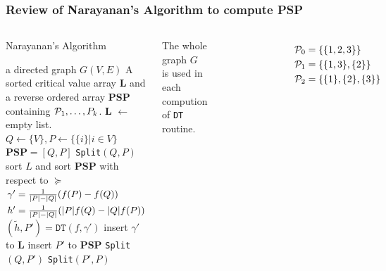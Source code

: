 \documentclass[notheorems]{beamer}
\begin{document}
\begin{frame}
\frametitle{Review of Narayanan's Algorithm to compute PSP}
\begin{columns}
\begin{algorithm}[H]
\caption*{Narayanan's Algorithm}\label{alg:psp}
{\tiny
\begin{algorithmic}[1]
\REQUIRE a directed graph $G(V,E)$
\ENSURE A sorted critical value array \textbf{L} and a reverse ordered array \textbf{PSP} containing $\P_1,\dots, P_k$.
\STATE \textbf{L}  $\leftarrow$ empty list.
\STATE $Q\leftarrow \{V\}, P \leftarrow \{ \{i \} | i \in V\}$
\STATE $\mathbf{PSP}= [Q, P]$
\STATE \texttt{Split}$(Q,P)$
\STATE sort $L$ and sort $\mathbf{PSP}$ with respect to $\succeq$ 
 \STATE\label{alg:gamma} $\gamma' = {1 \over \abs{P} - \abs{Q}} (f(P)-f(Q))$
 \STATE $h' = {1 \over \abs{P} - \abs{Q}}(\abs{P} f(Q) - \abs{Q} f(P))$
 \STATE $(\tilde{h}, P') = \texttt{DT}(f,\gamma')$
 	\STATE insert $\gamma'$ to $\mathbf{L}$
 \ELSE
 	\STATE insert $P'$ to $\mathbf{PSP}$
 	\STATE \texttt{Split}$(Q, P')$
 	\STATE \texttt{Split}$(P',P)$
 \ENDIF
\ENDFUNCTION
\end{algorithmic}
}
\end{algorithm}
The whole graph $G$ is used in each compution of \texttt{DT} routine.
\begin{figure}
\includegraphics[width=4.5cm]{pic/dt_with_graph.eps}
\end{figure}
\begin{align*}
\P_0  & = \{\{1,2,3\}\} \\
\P_1  & = \{\{1,3\},\{2\}\} \\
\P_2  & = \{\{1\},\{2\},\{3\}\} 
\end{align*}
\end{columns}
\end{frame}
\end{document}
